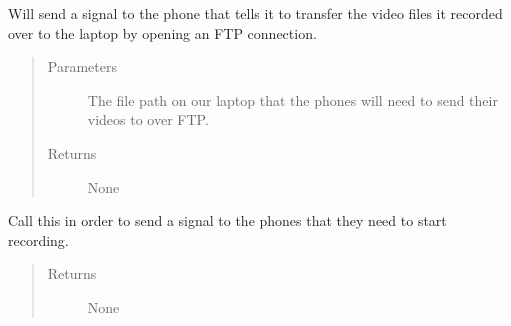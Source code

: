 \documentclass[letterpaper,10pt,english]{sphinxmanual}
\begin{document}
\begin{fulllineitems}
\begin{fulllineitems}
\begin{quote}
\begin{description}
\end{description}\end{quote}

\end{fulllineitems}


\begin{fulllineitems}
\label{\detokenize{index:src.Controllers.PhoneController.PhoneControl.startFileTransfer}}
Will send a signal to the phone that tells it to transfer the video files it recorded over to the laptop
by opening an FTP connection.
\begin{quote}\begin{description}
\item[{Parameters}] \leavevmode
{} \textendash{} The file path on our laptop that the phones will need to send their videos to over FTP.

\item[{Returns}] \leavevmode
None

\end{description}\end{quote}

\end{fulllineitems}


\begin{fulllineitems}
\label{\detokenize{index:src.Controllers.PhoneController.PhoneControl.startRecording}}
Call this in order to send a signal to the phones that they need to start recording.
\begin{quote}\begin{description}
\item[{Returns}] \leavevmode
None

\end{description}\end{quote}

\end{fulllineitems}


\end{fulllineitems}
\end{document}
